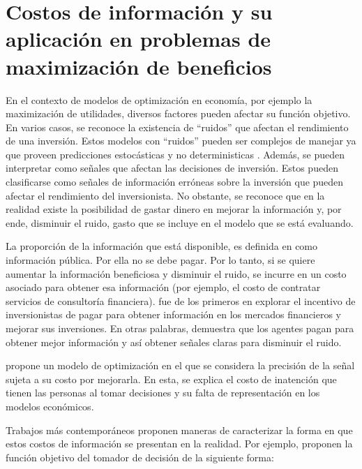 \section{Costos de información y su aplicación en problemas de maximización de beneficios}\label{marco:costos}

En el contexto de modelos de optimización en economía, por ejemplo la maximización de utilidades, diversos factores pueden afectar su función objetivo. En varios casos, se reconoce la existencia de ``ruidos'' que afectan el rendimiento de una inversión. Estos modelos con ``ruidos'' pueden ser complejos de manejar ya que proveen predicciones estocásticas y no deterministicas . Además, se pueden interpretar como señales que afectan las decisiones de inversión. Estos pueden clasificarse como señales de información erróneas sobre la inversión que pueden afectar el rendimiento del inversionista. No obstante, se reconoce que en la realidad existe la posibilidad de gastar dinero en mejorar la información y, por ende, disminuir el ruido, gasto que se incluye en el modelo que se está evaluando.
\vspace{2.5mm}

La proporción de la información que está disponible, es definida en como información pública. Por ella no se debe pagar. Por lo tanto, si se quiere aumentar la información beneficiosa y disminuir el ruido, se incurre en un costo asociado para obtener esa información (por ejemplo, el costo de contratar servicios de consultoría financiera).  fue de los primeros en explorar el incentivo de inversionistas de pagar para obtener información en los mercados financieros y mejorar sus inversiones. En otras palabras, demuestra que los agentes pagan para obtener mejor información y así obtener señales claras para disminuir el ruido. 
\vspace{2.5mm}

 propone un modelo de optimización en el que se considera la precisión de la señal sujeta a su costo por mejorarla. En esta, se explica el costo de inatención que tienen las personas al tomar decisiones y su falta de representación en los modelos económicos.
\vspace{2.5mm}

Trabajos más contemporáneos proponen maneras de caracterizar la forma en que estos costos de información se presentan en la realidad. Por ejemplo,  proponen la función objetivo del tomador de decisión de la siguiente forma: 

